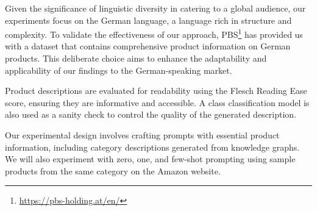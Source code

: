 
Given the significance of linguistic diversity in catering to a global audience, our experiments focus on the German language, a language rich in structure and complexity. To validate the effectiveness of our approach, PBS\footnote{\url{https://pbs-holding.at/en/}} has provided us with a dataset that contains comprehensive product information on German products. This deliberate choice aims to enhance the adaptability and applicability of our findings to the German-speaking market.

Product descriptions are evaluated for readability using the Flesch Reading Ease score, ensuring they are informative and accessible. A class classification model is also used as a sanity check to control the quality of the generated description.



Our experimental design involves crafting prompts with essential product information, including category descriptions generated from knowledge graphs. We will also experiment with zero, one, and few-shot prompting using sample products from the same category on the Amazon website.


